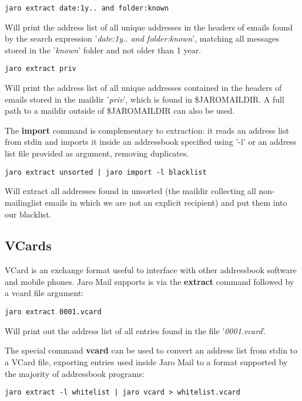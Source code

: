 \documentclass[a4,onecolumn,portrait]{article}
\begin{document}
\begin{verbatim}
jaro extract date:1y.. and folder:known
\end{verbatim}

Will print the address list of all unique addresses in the headers of emails found by the search expression '\emph{date:1y.. and folder:known}', matching all messages stored in the '\emph{known}' folder and not older than 1 year.

\begin{verbatim}
jaro extract priv
\end{verbatim}

Will print the address list of all unique addresses contained in the headers of emails stored in the maildir '\emph{priv}', which is found in \$JAROMAILDIR. A full path to a maildir outside of \$JAROMAILDIR can also be used.

The \textbf{import} command is complementary to extraction: it reads an address list from stdin and imports it inside an addressbook specified using '-l' or an address list file provided as argument, removing duplicates.

\begin{verbatim}
jaro extract unsorted | jaro import -l blacklist
\end{verbatim}

Will extract all addresses found in unsorted (the maildir collecting all non-mailinglist emails in which we are not an explicit recipient) and put them into our blacklist.
\subsection{VCards}
\label{sec-7-2}

VCard is an exchange format useful to interface with other addressbook software and mobile phones. Jaro Mail supports is via the \textbf{extract} command followed by a vcard file argument:

\begin{verbatim}
jaro extract 0001.vcard
\end{verbatim}

Will print out the address list of all entries found in the file '\emph{0001.vcard}'.

The special command \textbf{vcard} can be used to convert an address list from stdin to a VCard file, exporting entries used inside Jaro Mail to a format supported by the majority of addressbook programs:

\begin{verbatim}
jaro extract -l whitelist | jaro vcard > whitelist.vcard
\end{verbatim}
\end{document}
